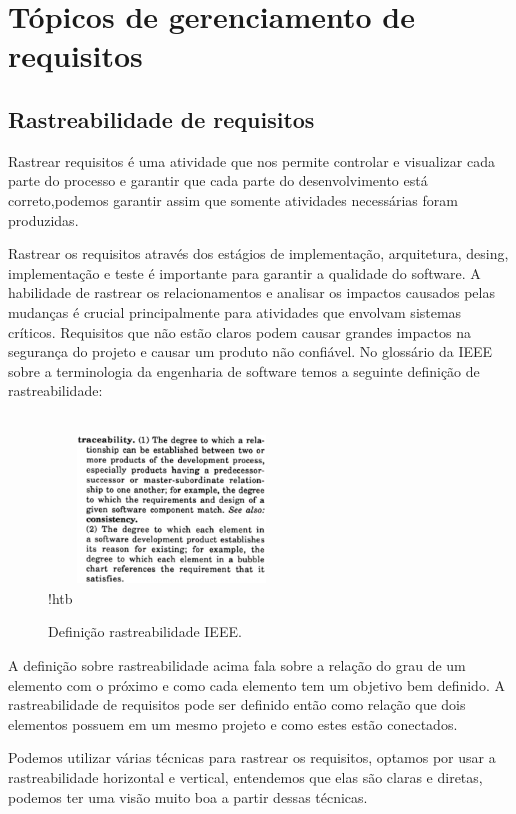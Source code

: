 \chapter{Tópicos de gerenciamento de requisitos}

	\section{Rastreabilidade de requisitos}
	Rastrear requisitos é uma atividade que nos permite controlar e visualizar cada parte do processo e garantir que cada parte do desenvolvimento está correto,podemos garantir assim que somente atividades necessárias foram produzidas.

	Rastrear os requisitos através dos estágios de implementação, arquitetura, desing, implementação e teste é importante para garantir a qualidade do software. A habilidade de rastrear os relacionamentos e analisar os impactos causados pelas mudanças é crucial principalmente para atividades que envolvam sistemas críticos. Requisitos que não estão claros podem causar grandes impactos na segurança do projeto e causar um produto não confiável.
	No glossário da IEEE sobre a terminologia da engenharia de software temos a seguinte definição de rastreabilidade:
  	\begin{figure}{!htb}
  		\centering
		\includegraphics[height=5cm, width=5cm]{figuras/definicao_rastreamento.eps}
		\caption{Definição rastreabilidade IEEE.}
	\end{figure}

	A definição sobre rastreabilidade acima fala sobre a relação do grau de um elemento com o próximo e como cada elemento tem um objetivo bem definido. A rastreabilidade de requisitos pode ser definido então como relação que dois elementos possuem em um mesmo projeto e como estes estão conectados.

	Podemos utilizar várias técnicas para rastrear os requisitos, optamos por usar a rastreabilidade horizontal e vertical, entendemos que elas são claras e diretas, podemos ter uma visão muito boa a partir dessas técnicas.

